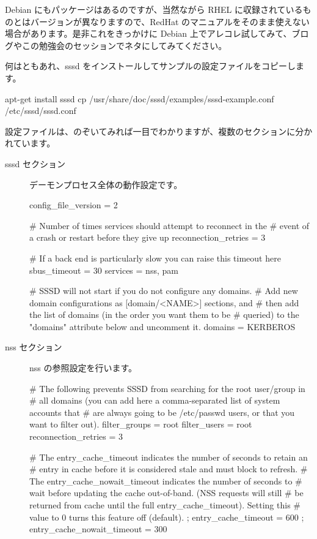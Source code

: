 \documentclass[mingoth,a4paper]{jsarticle}
\begin{document}
Debian にもパッケージはあるのですが、当然ながら RHEL に収録されているものとはバージョンが異なりますので、RedHat のマニュアルをそのまま使えない場合があります。是非これをきっかけに Debian 上でアレコレ試してみて、ブログやこの勉強会のセッションでネタにしてみてください。

何はともあれ、sssd をインストールしてサンプルの設定ファイルをコピーします。
\begin{commandline}
apt-get install sssd
cp /usr/share/doc/sssd/examples/sssd-example.conf /etc/sssd/sssd.conf
\end{commandline}

設定ファイルは、のぞいてみれば一目でわかりますが、複数のセクションに分かれています。

\begin{description}
\item [sssd セクション] デーモンプロセス全体の動作設定です。
  \begin{commandline}
config_file_version = 2

# Number of times services should attempt to reconnect in the
# event of a crash or restart before they give up
reconnection_retries = 3

# If a back end is particularly slow you can raise this timeout here
sbus_timeout = 30
services = nss, pam

# SSSD will not start if you do not configure any domains.
# Add new domain configurations as [domain/<NAME>] sections, and
# then add the list of domains (in the order you want them to be
# queried) to the "domains" attribute below and uncomment it.
domains = KERBEROS
\end{commandline}

\item [nss セクション] nss の参照設定を行います。
\begin{commandline}
# The following prevents SSSD from searching for the root user/group in
# all domains (you can add here a comma-separated list of system accounts that
# are always going to be /etc/passwd users, or that you want to filter out).
filter_groups = root
filter_users = root
reconnection_retries = 3

# The entry_cache_timeout indicates the number of seconds to retain an
# entry in cache before it is considered stale and must block to refresh.
# The entry_cache_nowait_timeout indicates the number of seconds to
# wait before updating the cache out-of-band. (NSS requests will still
# be returned from cache until the full entry_cache_timeout). Setting this
# value to 0 turns this feature off (default).
; entry_cache_timeout = 600
; entry_cache_nowait_timeout = 300
\end{commandline}


\end{description}
\end{document}
